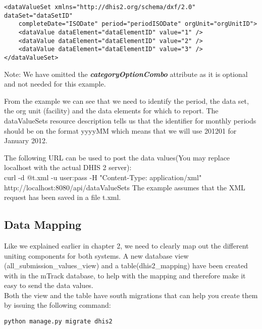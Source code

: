 \documentclass[11pt,a4paper]{article}
\begin{document}
\begin{verbatim}
<dataValueSet xmlns="http://dhis2.org/schema/dxf/2.0" dataSet="dataSetID" 
	completeDate="ISODate" period="periodISODate" orgUnit="orgUnitID">
	<dataValue dataElement="dataElementID" value="1" />
	<dataValue dataElement="dataElementID" value="2" />
	<dataValue dataElement="dataElementID" value="3" />
</dataValueSet>
\end{verbatim}
Note: We have omitted the \textbf{\emph{categoryOptionCombo}} attribute as it is optional and not needed for this example.

From the example we can see that we need to identify the period, the data set, the org unit (facility) and the data elements for which to report. The dataValueSets resource description tells us that the identifier for monthly periods should be on the format yyyyMM which means that we will use 201201 for January 2012.

The following URL can be used to post the data values(You may replace localhost with the actual DHIS 2 server):\\
curl -d @t.xml -u user:pass -H "Content-Type: application/xml" http://localhost:8080/api/dataValueSets
The example assumes that the XML request has been saved in a file t.xml.

\subsection{Data Mapping}
Like we explained earlier in chapter 2, we need to clearly map out the different uniting components for both systems. A new database view (all\_submission\_values\_view) and a table(dhis2\_mapping) have been created with in the mTrack database, to help with the mapping and therefore make it easy to send the data values.\\
Both the view and the table have south migrations that can help you create them by issuing the following command:
\begin{verbatim}
python manage.py migrate dhis2
\end{verbatim}
\end{document}
